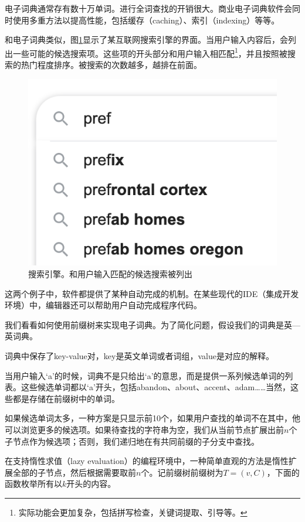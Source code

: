 \documentclass[b5paper]{ctexart}
\begin{document}
电子词典通常存有数十万单词。进行全词查找的开销很大。商业电子词典软件会同时使用多重方法以提高性能，包括缓存（caching）、索引（indexing）等等。

和电子词典类似，图\ref{fig:word-completion}显示了某互联网搜索引擎的界面。当用户输入内容后，会列出一些可能的候选搜索项。这些项的开头部分和用户输入相匹配\footnote{实际功能会更加复杂，包括拼写检查，关键词提取、引导等。}，并且按照被搜索的热门程度排序。被搜索的次数越多，越排在前面。

\begin{figure}[htbp]
  \centering
  \includegraphics[scale=0.5]{img/adaptive-input.png}
  \caption{搜索引擎。和用户输入匹配的候选搜索被列出}
  \label{fig:word-completion}
\end{figure}

这两个例子中，软件都提供了某种自动完成的机制。在某些现代的IDE（集成开发环境）中，编辑器还可以帮助用户自动完成程序代码。

我们看看如何使用前缀树来实现电子词典。为了简化问题，假设我们的词典是英—英词典。

词典中保存了key-value对，key是英文单词或者词组，value是对应的解释。

当用户输入‘a’的时候，词典不是只给出‘a’的意思，而是提供一系列候选单词的列表。这些候选单词都以‘a’开头，包括abandon、about、accent、adam……当然，这些都是存储在前缀树中的单词。

如果候选单词太多，一种方案是只显示前10个，如果用户查找的单词不在其中，他可以浏览更多的候选项。如果待查找的字符串为空，我们从当前节点扩展出前$n$个子节点作为候选项；否则，我们递归地在有共同前缀的子分支中查找。

在支持惰性求值（lazy evaluation）的编程环境中，一种简单直观的方法是惰性扩展全部的子节点，然后根据需要取前$n$个。记前缀树前缀树为$T = (v, C)$，下面的函数枚举所有以$k$开头的内容。
\end{document}
